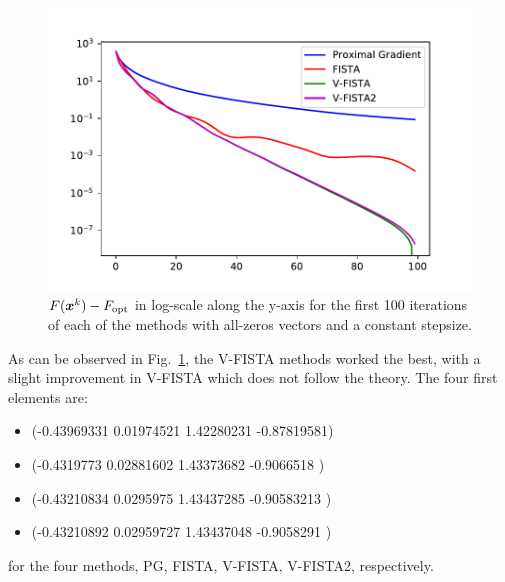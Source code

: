 \begin{figure}[H]
    \centering
    \includegraphics[width=14cm]{images/part2_ex0.pdf}
    \caption{$F(\boldsymbol x^k)-F_{\text{opt}}$ in log-scale along the 
  y-axis for the first 100 iterations of each of the methods 
  with all-zeros vectors and a constant stepsize. }
  \label{fig: ex0}
\end{figure}
%
As can be observed in Fig.~\ref{fig: ex0}, the V-FISTA 
methods worked the best, with a slight improvement in 
V-FISTA which does not follow the theory.
The four first elements are:
\begin{itemize}
    \item (-0.43969331  0.01974521  1.42280231 -0.87819581)
    \item (-0.4319773   0.02881602  1.43373682 -0.9066518 )
    \item (-0.43210834  0.0295975   1.43437285 -0.90583213 )
    \item (-0.43210892  0.02959727  1.43437048 -0.9058291 )
\end{itemize}
%
for the four methods, PG, FISTA,
V-FISTA, V-FISTA2, respectively.